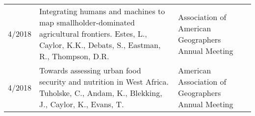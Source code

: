 \begin{supertabular}{lp{10.0cm}p{4.5cm}}
 \\
4/2018 & Integrating humans and machines to map smallholder-dominated agricultural frontiers. Estes, L., Caylor, K.K., Debats, S., Eastman, R., Thompson, D.R.  & Association of American Geographers Annual Meeting \\
4/2018 & Towards assessing urban food security and nutrition in West Africa. Tuholske, C., Andam, K., Blekking, J., Caylor, K., Evans, T. & American Association of Geographers Annual Meeting  \\
\end{supertabular}


